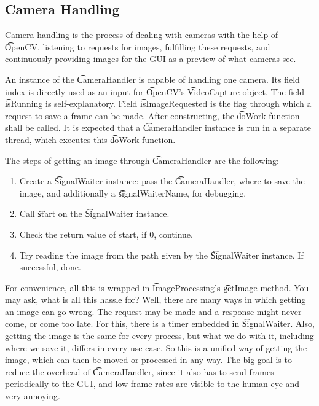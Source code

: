 \subsection{Camera Handling}

Camera handling is the process of dealing with cameras with the help of \t{OpenCV}, listening to requests for images, fulfilling these requests, and continuously providing images for the GUI as a preview of what cameras see.

An instance of the \t{CameraHandler} is capable of handling one camera. Its field index is directly used as an input for \t{OpenCV}'s \t{VideoCapture} object. The field \t{isRunning} is self-explanatory. Field \t{isImageRequested} is the flag through which a request to save a frame can be made. After constructing, the \t{doWork} function shall be called. It is expected that a \t{CameraHandler} instance is run in a separate thread, which executes this \t{doWork} function. 

The steps of getting an image through \t{CameraHandler} are the following:

\begin{enumerate}
    \item Create a \t{SignalWaiter} instance: pass the \t{CameraHandler}, where to save the image, and additionally a \t{signalWaiterName}, for debugging.
    \item Call \t{start} on the \t{SignalWaiter} instance.
    \item Check the return value of start, if 0, continue.
    \item Try reading the image from the path given by the \t{SignalWaiter} instance. If successful, done.
\end{enumerate}
\vspace{0.5cm}

For convenience, all this is wrapped in \t{ImageProcessing}'s \t{getImage} method. You may ask, what is all this hassle for? Well, there are many ways in which getting an image can go wrong. The request may be made and a response might never come, or come too late. For this, there is a timer embedded in \t{SignalWaiter}. Also, getting the image is the same for every process, but what we do with it, including where we save it, differs in every use case. So this is a unified way of getting the image, which can then be moved or processed in any way. The big goal is to reduce the overhead of \t{CameraHandler}, since it also has to send frames periodically to the GUI, and low frame rates are visible to the human eye and very annoying.

